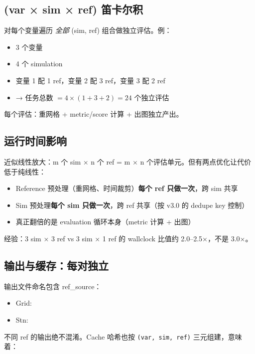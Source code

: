\subsection{(var × sim × ref) 笛卡尔积}

\openbench{} 对每个变量遍历 \emph{全部} (sim, ref) 组合做独立评估。例：

\begin{itemize}
  \item 3 个变量
  \item 4 个 simulation
  \item 变量 1 配 1 ref，变量 2 配 3 ref，变量 3 配 2 ref
  \item → 任务总数 $= 4 \times (1 + 3 + 2) = 24$ 个独立评估
\end{itemize}

每个评估：重网格 + metric/score 计算 + 出图独立产出。

\subsection{运行时间影响}

近似线性放大：m 个 sim × n 个 ref = m × n 个评估单元。但有两点优化让代价低于纯线性：

\begin{itemize}
  \item Reference 预处理（重网格、时间裁剪）\textbf{每个 ref 只做一次}，跨 sim 共享
  \item Sim 预处理\textbf{每个 sim 只做一次}，跨 ref 共享（按 v3.0  的 dedupe key 控制）
  \item 真正翻倍的是 evaluation 循环本身（metric 计算 + 出图）
\end{itemize}

经验：3 sim × 3 ref vs 3 sim × 1 ref 的 wallclock 比值约 2.0--2.5×，不是 3.0×。

\subsection{输出与缓存：每对独立}

输出文件命名包含 ref\_source：

\begin{itemize}
  \item Grid: 
  \item Stn: 
\end{itemize}

不同 ref 的输出绝不混淆。Cache 哈希也按 \texttt{(var, sim, ref)} 三元组建，意味着：

